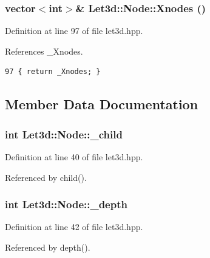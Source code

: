 \subsubsection{\setlength{\rightskip}{0pt plus 5cm}vector$<$int$>$\& Let3d::Node::Xnodes ()\hspace{0.3cm}{\tt  [inline]}}\label{classLet3d_1_1Node_1cfb3db72d5926015481da96073fbe27_1cfb3db72d5926015481da96073fbe27}




Definition at line 97 of file let3d.hpp.

References \_\-Xnodes.

\footnotesize\begin{verbatim}97 { return _Xnodes; }
\end{verbatim}\normalsize 




\subsection{Member Data Documentation}
\subsubsection{\setlength{\rightskip}{0pt plus 5cm}int {\bf Let3d::Node::\_\-child}\hspace{0.3cm}{\tt  [protected]}}\label{classLet3d_1_1Node_36884687800c2764057b78781a6d3525_36884687800c2764057b78781a6d3525}




Definition at line 40 of file let3d.hpp.

Referenced by child().
\subsubsection{\setlength{\rightskip}{0pt plus 5cm}int {\bf Let3d::Node::\_\-depth}\hspace{0.3cm}{\tt  [protected]}}\label{classLet3d_1_1Node_1a4b494c7ddb30acebee8498451bd389_1a4b494c7ddb30acebee8498451bd389}




Definition at line 42 of file let3d.hpp.

Referenced by depth().
